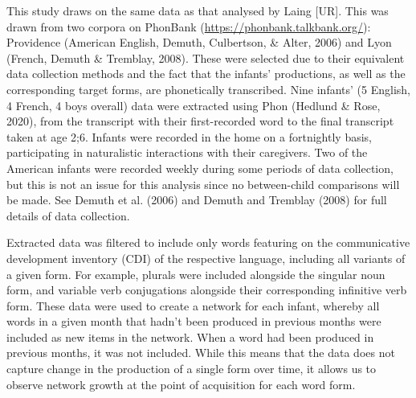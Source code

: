 \documentclass[
  man]{apa6}
\begin{document}
This study draws on the same data as that analysed by Laing {[}UR{]}. This was drawn from two corpora on PhonBank (\url{https://phonbank.talkbank.org/}): Providence (American English, Demuth, Culbertson, \& Alter, 2006) and Lyon (French, Demuth \& Tremblay, 2008). These were selected due to their equivalent data collection methods and the fact that the infants' productions, as well as the corresponding target forms, are phonetically transcribed. Nine infants' (5 English, 4 French, 4 boys overall) data were extracted using Phon (Hedlund \& Rose, 2020), from the transcript with their first-recorded word to the final transcript taken at age 2;6. Infants were recorded in the home on a fortnightly basis, participating in naturalistic interactions with their caregivers. Two of the American infants were recorded weekly during some periods of data collection, but this is not an issue for this analysis since no between-child comparisons will be made. See Demuth et al. (2006) and Demuth and Tremblay (2008) for full details of data collection.

Extracted data was filtered to include only words featuring on the communicative development inventory (CDI) of the respective language, including all variants of a given form. For example, plurals were included alongside the singular noun form, and variable verb conjugations alongside their corresponding infinitive verb form. These data were used to create a network for each infant, whereby all words in a given month that hadn't been produced in previous months were included as new items in the network. When a word had been produced in previous months, it was not included. While this means that the data does not capture change in the production of a single form over time, it allows us to observe network growth at the point of acquisition for each word form.
\end{document}
